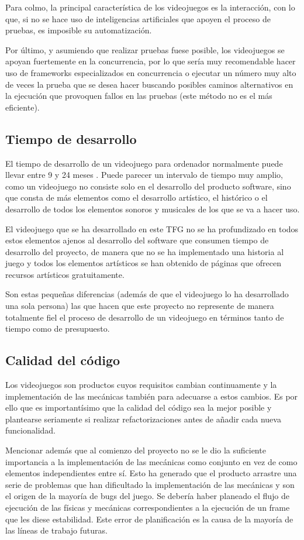Para colmo, la principal característica de los videojuegos es la interacción, con lo que, si no se hace uso de inteligencias artificiales que apoyen el proceso de pruebas, es imposible su automatización.

Por último, y asumiendo que realizar pruebas fuese posible, los videojuegos se apoyan fuertemente en la concurrencia, por lo que sería muy recomendable hacer uso de frameworks especializados en concurrencia o ejecutar un número muy alto de veces la prueba que se desea hacer buscando posibles caminos alternativos en la ejecución que provoquen fallos en las pruebas (este método no es el más eficiente).

\subsection{Tiempo de desarrollo}
El tiempo de desarrollo de un videojuego para ordenador normalmente puede llevar entre 9 y 24 meses \cite{TiempoDesarrollo}. Puede parecer un intervalo de tiempo muy amplio, como un videojuego no consiste solo en el desarrollo del producto software, sino que consta de más elementos como el desarrollo artístico, el histórico o el desarrollo de todos los elementos sonoros y musicales de los que se va a hacer uso.

El videojuego que se ha desarrollado en este TFG no se ha profundizado en todos estos elementos ajenos al desarrollo del software que consumen tiempo de desarrollo del proyecto, de manera que no se ha implementado una historia al juego y todos los elementos artísticos se han obtenido de páginas que ofrecen recursos artísticos gratuitamente.

Son estas pequeñas diferencias (además de que el videojuego lo ha desarrollado una sola persona) las que hacen que este proyecto no represente de manera totalmente fiel el proceso de desarrollo de un videojuego en términos tanto de tiempo como de presupuesto.

\subsection{Calidad del código}
Los videojuegos son productos cuyos requisitos cambian continuamente y la implementación de las mecánicas también para adecuarse a estos cambios. Es por ello que es importantísimo que la calidad del código sea la mejor posible y plantearse seriamente si realizar refactorizaciones antes de añadir cada nueva funcionalidad.

Mencionar además que al comienzo del proyecto no se le dio la suficiente importancia a la implementación de las mecánicas como conjunto en vez de como elementos independientes entre sí. Esto ha generado que el producto arrastre una serie de problemas que han dificultado la implementación de las mecánicas y son el origen de la mayoría de bugs del juego.
Se debería haber planeado el flujo de ejecución de las físicas y mecánicas correspondientes a la ejecución de un frame que les diese estabilidad. Este error de planificación es la causa de la mayoría de las líneas de trabajo futuras.

